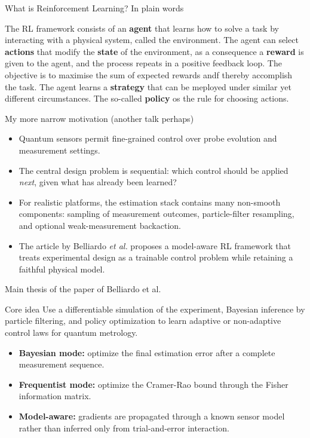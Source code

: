 \documentclass[aspectratio=169]{beamer}
\begin{document}
\begin{frame}{What is Reinforcement Learning? In plain words}
\begin{block}{}  

The RL framework consists of an {\bf agent} that learns how to solve a
task by interacting with a physical system, called the
environment. The agent can select {\bf actions} that modify the {\bf
  state} of the environment, as a consequence a {\bf reward} is given
to the agent, and the process repeats in a positive feedback loop. The
objective is to maximise the sum of expected rewards andf thereby
accomplish the task. The agent learns a {\bf strategy} that can be
meployed under similar yet different circumstances. The so-called {\bf
  policy} os the rule for choosing actions.

\end{block}
\end{frame}


\begin{frame}{My more narrow motivation (another talk perhaps)}
\begin{itemize}
  \item Quantum sensors permit fine-grained control over probe evolution and measurement settings.
  \item The central design problem is sequential: which control should be applied \emph{next}, given what has already been learned?
  \item For realistic platforms, the estimation stack contains many non-smooth components: sampling of measurement outcomes, particle-filter resampling, and optional weak-measurement backaction.
  \item The article by Belliardo {\em et al.}  proposes a \alert{model-aware RL} framework that treats experimental design as a trainable control problem while retaining a faithful physical model.
\end{itemize}
\end{frame}

\begin{frame}{Main thesis of the paper of Belliardo et al.}
\begin{block}{Core idea}
Use a differentiable simulation of the experiment, Bayesian inference by particle filtering, and policy optimization to learn adaptive or non-adaptive control laws for quantum metrology.
\end{block}
\begin{itemize}
  \item \textbf{Bayesian mode:} optimize the final estimation error after a complete measurement sequence.
  \item \textbf{Frequentist mode:} optimize the Cramer-Rao bound through the Fisher information matrix.
  \item \textbf{Model-aware:} gradients are propagated through a known sensor model rather than inferred only from trial-and-error interaction.
\end{itemize}
\end{frame}
\end{document}
